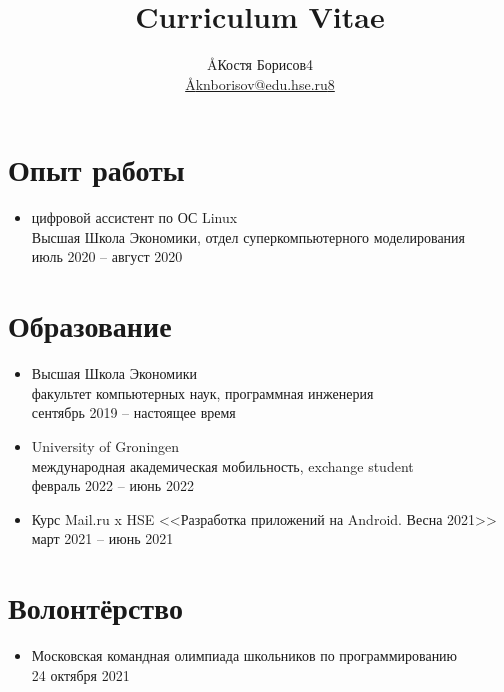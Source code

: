 \documentclass[12pt]{article}
\title{Curriculum Vitae}
\author{\AA{Костя Борисов}{4} \\ \href{mailto:\AA{knborisov@edu.hse.ru}{8}}{\AA{knborisov@edu.hse.ru}{8}}}
\begin{document}
  \maketitle

  \section{Опыт работы}
  \begin{itemize}
    \item цифровой ассистент по ОС Linux \\
      Высшая Школа Экономики, отдел суперкомпьютерного моделирования \\
      июль 2020 -- август 2020

  \end{itemize}

  \section{Образование}
  \begin{itemize}
    \item Высшая Школа Экономики \\
      факультет компьютерных наук, программная инженерия \\
      сентябрь 2019 -- настоящее время

    \item University of Groningen \\
      международная академическая мобильность, exchange student \\
      февраль 2022 -- июнь 2022

    \item Курс Mail.ru x HSE <<Разработка приложений на Android. Весна 2021>> \\
      март 2021 -- июнь 2021

  \end{itemize}

  \section{Волонтёрство}
  \begin{itemize}
    \item Московская командная олимпиада школьников по программированию \\
      24 октября 2021

  \end{itemize}
\end{document}
